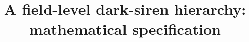 \documentclass[11pt]{article}
\title{A field-level dark-siren hierarchy:\\ mathematical specification}
\date{}
\theoremstyle{definition}
\theoremstyle{remark}
\begin{document}
\maketitle
\tableofcontents
\bigskip

\end{document}
